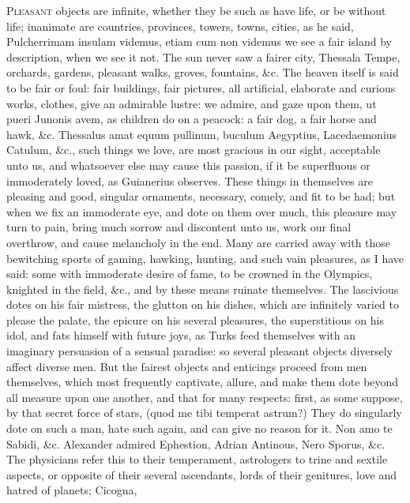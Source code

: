 {\lettrine{P}{leasant} objects are infinite, whether they be such as have life, or be
without life; inanimate are countries, provinces, towers, towns,
cities, as he said, Pulcherrimam insulam videmus, etiam cum non
videmus we see a fair island by description, when we see it not. The
sun never saw a fairer city, Thessala Tempe, orchards, gardens,
pleasant walks, groves, fountains, \&c. The heaven itself is said to be
fair or foul: fair buildings, fair pictures, all
artificial, elaborate and curious works, clothes, give an admirable
lustre: we admire, and gaze upon them, ut pueri Junonis avem, as
children do on a peacock: a fair dog, a fair horse and hawk, \&c.
Thessalus amat equum pullinum, buculum Aegyptius, Lacedaemonius
Catulum, \&c., such things we love, are most gracious in our sight,
acceptable unto us, and whatsoever else may cause this passion, if it
be superfluous or immoderately loved, as Guianerius observes. These
things in themselves are pleasing and good, singular ornaments,
necessary, comely, and fit to be had; but when we fix an immoderate
eye, and dote on them over much, this pleasure may turn to pain, bring
much sorrow and discontent unto us, work our final overthrow, and cause
melancholy in the end. Many are carried away with those bewitching
sports of gaming, hawking, hunting, and such vain pleasures, as I
have said: some with immoderate desire of fame, to be crowned in the
Olympics, knighted in the field, \&c., and by these means ruinate
themselves. The lascivious dotes on his fair mistress, the glutton on
his dishes, which are infinitely varied to please the palate, the
epicure on his several pleasures, the superstitious on his idol, and
fats himself with future joys, as Turks feed themselves with an
imaginary persuasion of a sensual paradise: so several pleasant objects
diversely affect diverse men. But the fairest objects and enticings
proceed from men themselves, which most frequently captivate, allure,
and make them dote beyond all measure upon one another, and that for
many respects: first, as some suppose, by that secret force of stars,
(quod me tibi temperat astrum?) They do singularly dote on such a man,
hate such again, and can give no reason for it. Non amo te
Sabidi, \&c. Alexander admired Ephestion, Adrian Antinous, Nero Sporus,
\&c. The physicians refer this to their temperament, astrologers to
trine and sextile aspects, or opposite of their several ascendants,
lords of their genitures, love and hatred of planets;  Cicogna,
}
